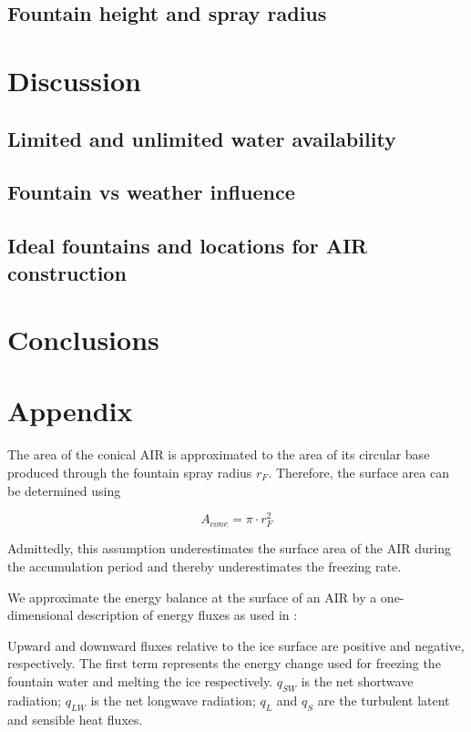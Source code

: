 \documentclass[utf8]{frontiersSCNS}
\begin{document}
\subsection{Fountain height and spray radius}


\section{Discussion}

\subsection{Limited and unlimited water availability}

\subsection{Fountain vs weather influence}

\subsection{Ideal fountains and locations for AIR construction}

\section{Conclusions}


\section{Appendix}

The area of the conical AIR is approximated to the area of its circular base produced through the fountain spray
radius $r_F$. Therefore, the surface area can be determined using

\begin{equation} A_{cone} =\pi \cdot r_{F}^2 \label{eq:Area} \end{equation}

Admittedly, this assumption underestimates the surface area of the AIR during the accumulation period and
thereby underestimates the freezing rate.

We approximate the energy balance at the surface of an AIR by a one-dimensional description of energy fluxes as
used in \cite{balasubramanianInfluenceMeteorologicalConditions2022}:


Upward and downward fluxes relative to the ice surface are positive and negative, respectively. The first
term represents the energy change used for freezing the fountain water and melting the ice respectively.
$q_{SW}$ is the net shortwave radiation; $q_{LW}$ is the net longwave radiation; $q_{L}$ and $q_{S}$ are the
turbulent latent and sensible heat fluxes. 
\end{document}
